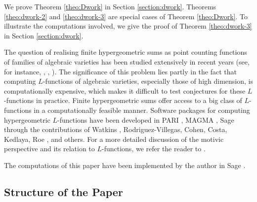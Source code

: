 \documentclass[11pt, reqno]{amsart}
\theoremstyle{plain}
\theoremstyle{definition}
\begin{document}
We prove Theorem \ref{theo:Dwork} in Section \ref{section:dwork}. 
Theorems \ref{theo:dwork-2} and \ref{theo:dwork-3} are special cases of Theorem \ref{theo:Dwork}. To illustrate the computations involved, we give the proof of Theorem \ref{theo:dwork-3} in Section \ref{section:dwork}.

The question of realising finite hypergeometric sums as point counting functions of families of algebraic varieties has been studied extensively in recent years (see, for instance, \cite{BCM}, \cite{ams-finite-fields-hypergeometric}, \cite{voight-kelly}). 
The significance of this problem lies partly in the fact that computing $L$-functions of algebraic varieties, especially those of high dimension, is computationally expensive, which makes it difficult to test conjectures for these $L$-functions in practice. 
Finite hypergeometric sums offer access to a big class of $L$-functions in a computationally feasible manner. Software packages for computing hypergeometric $L$-functions have been developed in PARI \cite{PARI2}, MAGMA \cite{MAGMA}, Sage \cite{sagemath} through the contributions of Watkins \cite{watkins}, Rodriguez-Villegas, Cohen, Costa, Kedlaya, Roe \cite{kedlaya-costa-roe-1}, \cite{kedlaya-costa-roe-2} and others. For a more detailed discussion of the motivic perspective and its relation to $L$-functions, we refer the reader to \cite{hypergeometric-survey}.


The computations of this paper have been implemented by the author in 
Sage \cite{sagemath}.
\subsection*{Structure of the Paper}
\end{document}
